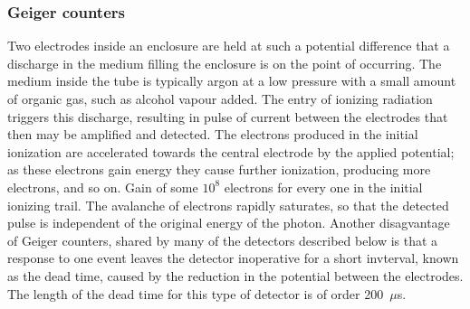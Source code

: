 \subsubsection{Geiger counters}
Two electrodes inside an enclosure are held at such a 
potential difference that a discharge in the medium filling the enclosure
is on the point of occurring. The medium inside the tube is typically argon at a 
low pressure with a small amount of organic gas, such as alcohol vapour added.
The entry of ionizing radiation triggers this discharge,
resulting in pulse of current between the electrodes that then may be amplified and
detected. The electrons produced in the initial ionization are accelerated towards
the central electrode by the applied potential; as these electrons gain energy they
cause further ionization, producing more electrons, and so on. Gain of some $10^8$ electrons for every one in the initial ionizing trail. The avalanche of electrons rapidly 
saturates, so that the detected pulse is independent of the original energy of the
photon. Another disagvantage of Geiger counters, shared by many of the
detectors described below is that a response to one event leaves the
detector inoperative for a short invterval, known as the dead
time, caused by the reduction in the potential between the
electrodes. The length of the dead time for this type of detector is of
order 200~$\mu$s.

